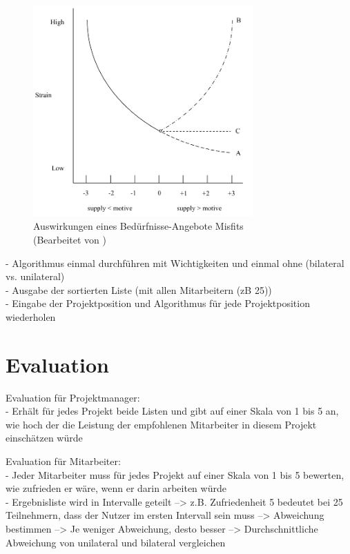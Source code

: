 \begin{figure}[h]
	\centering
	\includegraphics[width=0.75\textwidth]{gfx/ueberschuss_supply_motive.png}
	\caption{Auswirkungen eines Bedürfnisse-Angebote Misfits \cite[S. 23]{edwards:2008}\\(Bearbeitet von \myName)}
	\label{fig:methodik:abb2}
\end{figure}

- Algorithmus einmal durchführen mit Wichtigkeiten und einmal ohne (bilateral vs. unilateral)\\
- Ausgabe der sortierten Liste (mit allen Mitarbeitern (zB 25))\\
- Eingabe der Projektposition und Algorithmus für jede Projektposition wiederholen

\section{Evaluation}
\label{ch:methodik:evaluation}
Evaluation für Projektmanager:\\
- Erhält für jedes Projekt beide Listen und gibt auf einer Skala von 1 bis 5 an, wie hoch der die Leistung der empfohlenen Mitarbeiter in diesem Projekt einschätzen würde

Evaluation für Mitarbeiter:\\
- Jeder Mitarbeiter muss für jedes Projekt auf einer Skala von 1 bis 5 bewerten, wie zufrieden er wäre, wenn er darin arbeiten würde\\
- Ergebnisliste wird in Intervalle geteilt --> z.B. Zufriedenheit 5 bedeutet bei 25 Teilnehmern, dass der Nutzer im ersten Intervall sein muss --> Abweichung bestimmen --> Je weniger Abweichung, desto besser --> Durchschnittliche Abweichung von unilateral und bilateral vergleichen
